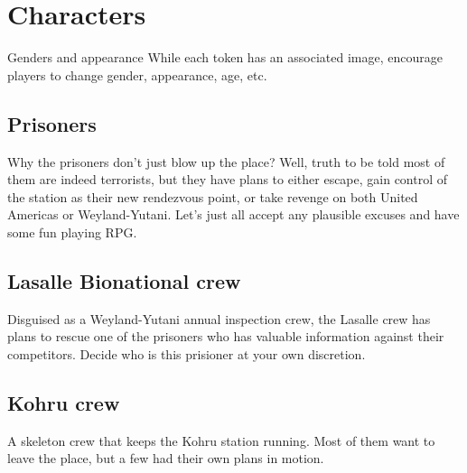 \chapter{Characters}


\begin{rpg-warnbox}{Genders and appearance}
    While each token has an associated image, encourage players to change gender, appearance, age, etc.
\end{rpg-warnbox}



\section{Prisoners}

Why the prisoners don't just blow up the place? Well, truth to be told most of them are indeed terrorists, but they have plans to either escape, gain control of the station as their new rendezvous point, or take revenge on both United Americas or  Weyland-Yutani. Let's just all accept any plausible excuses and have some fun playing RPG. 




\clearpage


\section{Lasalle Bionational crew}

Disguised as a Weyland-Yutani annual inspection crew, the Lasalle crew has plans to rescue one of the prisoners who has valuable information against their competitors. Decide who is this prisioner at your own discretion.



\clearpage




\section{Kohru crew}

A skeleton crew that keeps the Kohru station running. Most of them want to leave the place, but a few had their own plans in motion.





